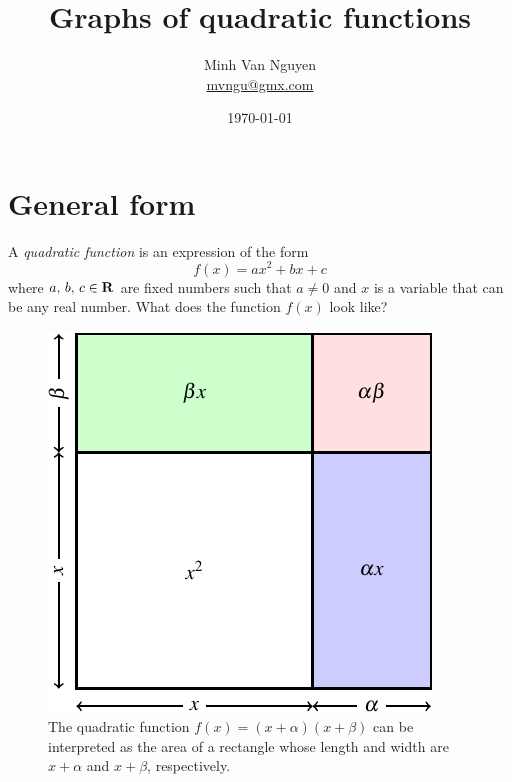 \documentclass[a4paper,oneside,12pt]{article}
\begin{document}
\title{\Large\bf Graphs of quadratic functions}
\author{%
  Minh Van Nguyen \\
  \url{mvngu@gmx.com}
}
\date{\today}
\maketitle



\section{General form}
\label{sec:general_form}

A \emph{quadratic function} is an expression of the form
\begin{equation}
\label{eqn:general_quadratic_function}
f(x)
=
ax^2 + bx + c
\end{equation}
where ${a},\, {b},\, {c} \in \mathbf{R}$ are fixed numbers such that
$a \neq 0$ and $x$ is a variable that can be any real number.  What
does the function $f(x)$ look like?

\begin{figure}[!htbp]
\centering
\includegraphics[scale=1.1]{image/08/quadratic-as-square.pdf}
\caption{%
  The quadratic function $f(x) = (x + \alpha)(x + \beta)$ can be
  interpreted as the area of a rectangle whose length and width are
  $x + \alpha$ and $x + \beta$, respectively.
}
\label{fig:quadratic_as_rectangle}
\end{figure}
\end{document}

